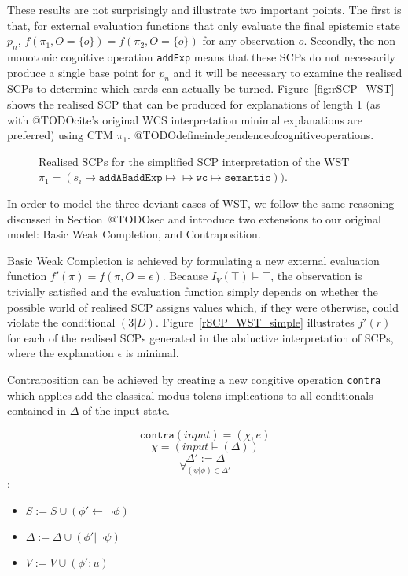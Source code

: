 These results are not surprisingly and illustrate two important points. The first is that, for external evaluation functions that only evaluate the final epistemic state $p_n$, $f(\pi_1,O=\{o\})=f(\pi_2,O=\{o\})$ for any observation $o$. Secondly, the non-monotonic cognitive operation \texttt{addExp} means that these SCPs do not necessarily produce a single base point for $p_n$ and it will be necessary to examine the realised SCPs to determine which cards can actually be turned. Figure~\ref{fig:rSCP_WST} shows the realised SCP that can be produced for explanations of length 1 (as with @TODOcite's original WCS interpretation minimal explanations are preferred) using CTM $\pi_1$. @TODOdefineindependenceofcognitiveoperations. 

\begin{figure}
\label{fig:rSCP_WST_simple}
\caption{Realised SCPs for the simplified SCP interpretation of the WST $\pi_1=(s_i \longmapsto \texttt{addAB} \texttt{addExp} \longmapsto \longmapsto \texttt{wc} \longmapsto \texttt{semantic}))$.}
\end{figure}

In order to model the three deviant cases of WST, we follow the same reasoning discussed in Section~@TODOsec and introduce two extensions to our original model: Basic Weak Completion, and Contraposition.

Basic Weak Completion is achieved by formulating a new external evaluation function $f'(\pi)=f(\pi,O=\epsilon)$. Because $I_V(\top)\models \top$, the observation is trivially satisfied and the evaluation function simply depends on whether the possible world of realised SCP assigns values which, if they were otherwise, could violate the conditional $(3|D)$. Figure~\ref{rSCP_WST_simple} illustrates $f'(r)$ for each of the realised SCPs generated in the abductive interpretation of SCPs, where the explanation $\epsilon$  is minimal.

Contraposition can be achieved by creating a new congitive operation \texttt{contra} which applies add the classical modus tolens implications to all conditionals contained in $\Delta$ of the input state.

\[\texttt{contra}(\textit{input})=(\chi,e)\]
\[\chi=(\textit{input}\models (\Delta))\]
\[\Delta' := \Delta\]
\[\forall_{(\psi|\phi) \in \Delta'}\]:
\begin{itemize}
\item $S:=S \cup (\phi'\leftarrow \lnot \phi)$
\item $\Delta := \Delta\cup (\phi'| \lnot \psi)$
\item $V:=V\cup(\phi':u)$
\end{itemize}



















